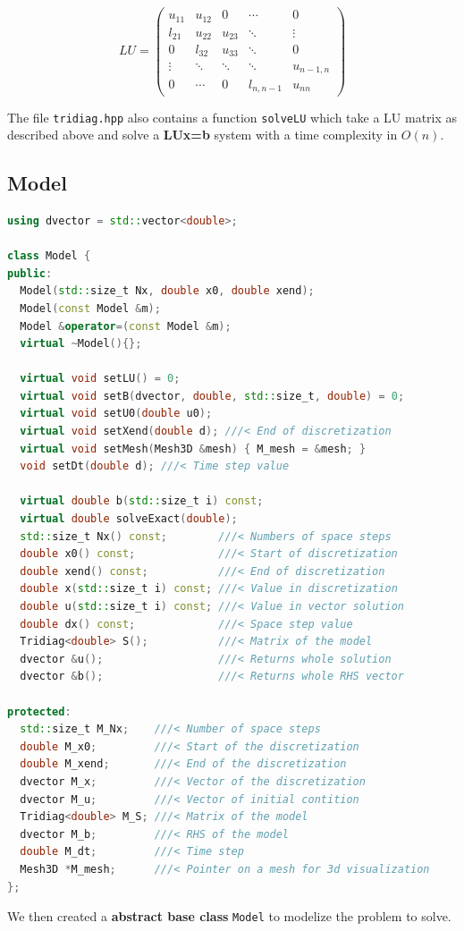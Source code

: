 \documentclass{article}
\begin{document}
\[
LU =
\begin{pmatrix}
    u_{11} & u_{12} & 0 & \cdots  & 0 \\
    l_{21} & u_{22} & u_{23} &  \ddots & \vdots \\
     0& l_{32} & u_{33} & \ddots & 0 \\
     \vdots&\ddots & \ddots & \ddots & u_{n-1,n}  \\
     0 & \cdots & 0 & l_{n, n-1} & u_{nn}
\end{pmatrix}
\]



The file \texttt{tridiag.hpp} also contains a function \texttt{solveLU} which take a LU matrix as described above and solve a \textbf{LUx=b} system with a time complexity in $O(n)$.

\subsection{Model}
\begin{lstlisting}[language=c++]
using dvector = std::vector<double>;

class Model {
public:
  Model(std::size_t Nx, double x0, double xend);
  Model(const Model &m);
  Model &operator=(const Model &m);
  virtual ~Model(){};

  virtual void setLU() = 0;
  virtual void setB(dvector, double, std::size_t, double) = 0;
  virtual void setU0(double u0);
  virtual void setXend(double d); ///< End of discretization
  virtual void setMesh(Mesh3D &mesh) { M_mesh = &mesh; }
  void setDt(double d); ///< Time step value

  virtual double b(std::size_t i) const;
  virtual double solveExact(double);
  std::size_t Nx() const;        ///< Numbers of space steps
  double x0() const;             ///< Start of discretization
  double xend() const;           ///< End of discretization
  double x(std::size_t i) const; ///< Value in discretization
  double u(std::size_t i) const; ///< Value in vector solution
  double dx() const;             ///< Space step value
  Tridiag<double> S();           ///< Matrix of the model
  dvector &u();                  ///< Returns whole solution 
  dvector &b();                  ///< Returns whole RHS vector

protected:
  std::size_t M_Nx;    ///< Number of space steps
  double M_x0;         ///< Start of the discretization
  double M_xend;       ///< End of the discretization
  dvector M_x;         ///< Vector of the discretization
  dvector M_u;         ///< Vector of initial contition
  Tridiag<double> M_S; ///< Matrix of the model
  dvector M_b;         ///< RHS of the model
  double M_dt;         ///< Time step
  Mesh3D *M_mesh;      ///< Pointer on a mesh for 3d visualization
};
\end{lstlisting}
We then created a \textbf{abstract base class} \texttt{Model} to modelize the problem to solve.   \\
\end{document}
